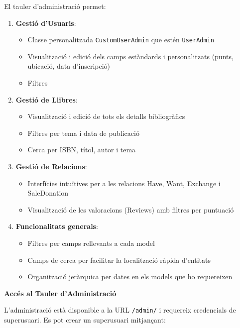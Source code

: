 El tauler d'administració permet:

\begin{enumerate}
\def\labelenumi{\arabic{enumi}.}
\tightlist
\item
  \textbf{Gestió d'Usuaris}:

  \begin{itemize}
  \tightlist
  \item
    Classe personalitzada \texttt{CustomUserAdmin} que estén
    \texttt{UserAdmin}
  \item
    Visualització i edició dels camps estàndards i personalitzats
    (punts, ubicació, data d'inscripció)
  \item
    Filtres
  \end{itemize}
\item
  \textbf{Gestió de Llibres}:

  \begin{itemize}
  \tightlist
  \item
    Visualització i edició de tots els detalls bibliogràfics
  \item
    Filtres per tema i data de publicació
  \item
    Cerca per ISBN, títol, autor i tema
  \end{itemize}
\item
  \textbf{Gestió de Relacions}:

  \begin{itemize}
  \tightlist
  \item
    Interfícies intuïtives per a les relacions Have, Want, Exchange i
    SaleDonation
  \item
    Visualització de les valoracions (Reviews) amb filtres per puntuació
  \end{itemize}
\item
  \textbf{Funcionalitats generals}:

  \begin{itemize}
  \tightlist
  \item
    Filtres per camps rellevants a cada model
  \item
    Camps de cerca per facilitar la localització ràpida d'entitats
  \item
    Organització jeràrquica per dates en els models que ho requereixen
  \end{itemize}
\end{enumerate}

\textbf{Accés al Tauler d'Administració}

L'administració està disponible a la URL \texttt{/admin/} i requereix
credencials de superusuari. Es pot crear un superusuari mitjançant:


